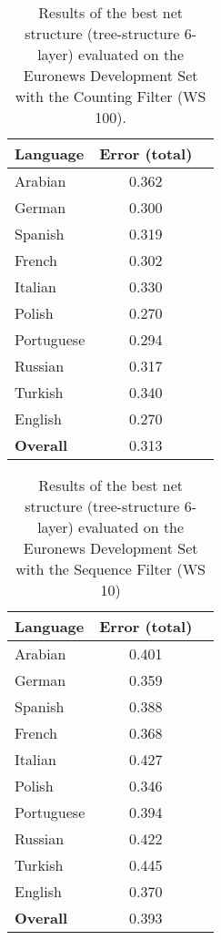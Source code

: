 \begin{table}[!htbp]
\centering
\caption{Results of the best net structure (tree-structure 6-layer) evaluated on the Euronews Development Set with the Counting Filter (WS 100).}
\label{tab:countingDetail}
\begin{tabular}{| l | c | r | }
	\hline
	\textbf{Language} & \textbf{Error (total) }  \\
	\hline
	Arabian & 0.362  \\
	German & 0.300  \\
	Spanish & 0.319 \\ 
	French & 0.302 \\
	Italian & 0.330  \\
	Polish & 0.270 \\
	Portuguese& 0.294 \\
	Russian&  0.317 \\
	Turkish&  0.340 \\
	English&  0.270 \\
	\hline
	\textbf{Overall} & 0.313 \\
	\hline
\end{tabular}
\end{table}

\begin{table}[!htbp]
\centering
\caption{Results of the best net structure (tree-structure 6-layer) evaluated on the Euronews Development Set with the Sequence Filter (WS 10)}
\label{tab:sequence}
\begin{tabular}{| l | c | r | }
	\hline
	\textbf{Language} & \textbf{Error (total) }  \\
	\hline
	Arabian & 0.401  \\
	German & 0.359  \\
	Spanish & 0.388 \\ 
	French & 0.368 \\
	Italian & 0.427  \\
	Polish & 0.346 \\
	Portuguese& 0.394 \\
	Russian&  0.422 \\
	Turkish&  0.445 \\
	English&  0.370 \\
	\hline
	\textbf{Overall} & 0.393 \\
	\hline
\end{tabular}
\end{table}

